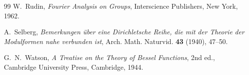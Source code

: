 \documentclass[11pt]{article}
\theoremstyle{definition}
\newcommand{\1}{\mathbf 1}
\begin{document}
\begin{thebibliography}{99}
W.~Rudin,
\textit{Fourier Analysis on Groups},
Interscience Publishers, New York, 1962.

A.~Selberg,
\textit{Bemerkungen \"uber eine Dirichletsche Reihe, die mit der Theorie der Modulformen nahe verbunden ist},
Arch. Math. Naturvid. \textbf{43} (1940), 47--50.

G.~N.~Watson,
\textit{A Treatise on the Theory of Bessel Functions},
2nd ed., Cambridge University Press, Cambridge, 1944.

\end{thebibliography}
\end{document}
